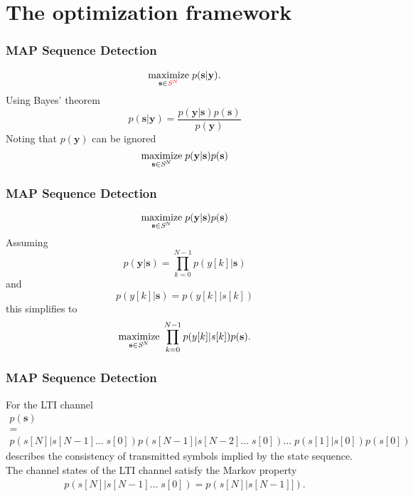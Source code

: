 \documentclass[10pt,tgadventor, onlymath]{beamer}
\begin{document}
\section{The optimization framework}

\begin{frame}
\frametitle{MAP Sequence Detection}
\begin{equation*}
\underset{\mathbf{s}\in\textcolor{red}{\textit{\cal{S}}^N}}{\text{maximize}} \; p(\mathbf{s}|\mathbf{y}).
\end{equation*} 
\pause
Using Bayes' theorem
\begin{equation*}
p(\mathbf{s}|\mathbf{y}) = 
\frac
{p(\mathbf{y}|\mathbf{s})p(\mathbf{s})}
{p(\mathbf{y})}
\end{equation*} 
Noting that $p(\mathbf{y})$ can be ignored 
\pause
\begin{equation}\label{opt_problem}
\underset{\mathbf{s}\in\textit{\cal{S}}^N}{\text{maximize}}\; p(\mathbf{y}|\mathbf{s})p(\mathbf{s})
\end{equation}

\end{frame}

\begin{frame}
\frametitle{MAP Sequence Detection}
\begin{equation*}\label{opt_problem}
\underset{\mathbf{s}\in\textit{\cal{S}}^N}{\text{maximize}}\; p(\mathbf{y}|\mathbf{s})p(\mathbf{s})
\end{equation*}
\pause
Assuming 
\begin{equation*}
p(\mathbf{y}|\mathbf{s}) = \prod_{k=0}^{N-1} p(y[k]|\mathbf{s})
\end{equation*}
\pause
and 
\begin{equation*}
p(y[k]|\mathbf{s}) = p(y[k]|s[k])
\end{equation*}
\pause
this simplifies to 
\begin{equation*}\label{opt_problem}
\underset{\mathbf{s}\in\textit{\cal{S}}^N}{\text{maximize}}\; \prod_{k=0}^{N-1} p(y[k]|s[k])p(\mathbf{s}).
\end{equation*}
\end{frame}

\begin{frame}
\frametitle{MAP Sequence Detection}
For the LTI channel
\begin{gather*}
p(\mathbf{s}) \\=\\
 p(s[N]| s[N-1]... \; s[0]) p(s[N-1]| s[N-2]... \; s[0])... \; p(s[1]| s[0])p(s[0])
\end{gather*}
describes the consistency of transmitted symbols implied by the state sequence.
The channel states of the LTI channel satisfy the Markov property 
\begin{gather*}
 p(s[N]| s[N-1]... \; s[0]) =  p(s[N]| s[N-1]]).
\end{gather*}

\end{frame}
\end{document}
